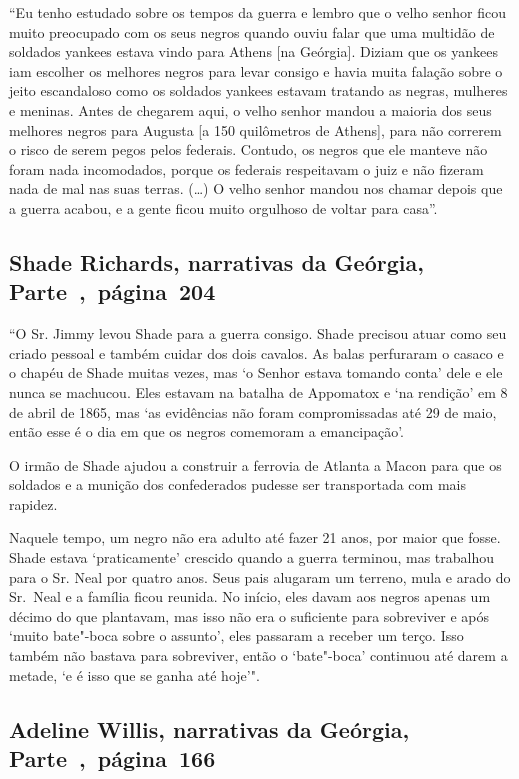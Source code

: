 ``Eu tenho estudado sobre os tempos da guerra e lembro que o velho
senhor ficou muito preocupado com os seus negros quando ouviu falar que
uma multidão de soldados yankees estava vindo para Athens {[}na
Geórgia{]}. Diziam que os yankees iam escolher os melhores negros para
levar consigo e havia muita falação sobre o jeito escandaloso como os
soldados yankees estavam tratando as negras, mulheres e meninas. Antes
de chegarem aqui, o velho senhor mandou a maioria dos seus melhores
negros para Augusta {[}a 150 quilômetros de Athens{]}, para não correrem o risco
de serem pegos pelos federais. Contudo, os negros que ele manteve não
foram nada incomodados, porque os federais respeitavam o juiz e não
fizeram nada de mal nas suas terras. (\ldots{}) O velho senhor mandou
nos chamar depois que a guerra acabou, e a gente ficou muito orgulhoso
de voltar para casa''.

\subsection{Shade Richards, narrativas da Geórgia, Parte~,~página~204}
\label{ref224}

``O Sr. Jimmy levou Shade para a guerra consigo. Shade precisou atuar
como seu criado pessoal e também cuidar dos dois cavalos. As balas
perfuraram o casaco e o chapéu de Shade muitas vezes, mas `o Senhor
estava tomando conta' dele e ele nunca se machucou. Eles estavam na
batalha de Appomatox e `na rendição' em 8 de abril de 1865, mas `as
evidências não foram compromissadas até 29 de maio, então esse é o dia
em que os negros comemoram a emancipação'.

O irmão de Shade ajudou a construir a ferrovia de Atlanta a Macon para
que os soldados e a munição dos confederados pudesse ser transportada
com mais rapidez.

Naquele tempo, um negro não era adulto até fazer 21 anos, por maior que
fosse. Shade estava `praticamente' crescido quando a guerra terminou,
mas trabalhou para o Sr. Neal por quatro anos. Seus pais alugaram um
terreno, mula e arado do Sr.~Neal e a família ficou reunida. No início,
eles davam aos negros apenas um décimo do que plantavam, mas isso não
era o suficiente para sobreviver e após `muito bate"-boca sobre o
assunto', eles passaram a receber um terço. Isso também não bastava para
sobreviver, então o `bate"-boca' continuou até darem a metade, `e é isso
que se ganha até hoje'".

\subsection{Adeline Willis, narrativas da Geórgia, Parte~,~página~166}
\label{ref299}

